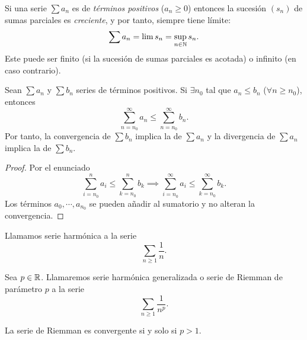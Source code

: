 \begin{prop}
    Si una serie $\sum a_n$ es de \textit{términos positivos} ($a_n \geq 0$) entonces la
    sucesión $(s_n)$ de sumas parciales es \textit{creciente}, y por tanto, siempre tiene
    límite:
    \[
        \sum a_n = \lim s_n = \sup_{n \in \mathbb{N}} s_n.
    \]
    Este puede ser finito (si la sucesión de sumas parciales es acotada) o infinito (en caso
    contrario).
\end{prop}

\begin{prop}
    Sean $\sum a_n$ y $\sum b_n$ series de términos positivos. Si $\exists n_0$ tal que
    $a_n \leq b_n$ ($\forall n \geq n_0$), entonces
    \[
        \sum_{n=n_0}^{\infty} a_n \leq \sum_{n=n_0}^{\infty} b_n.
    \]
    Por tanto, la convergencia de $\sum b_n$ implica la de $\sum a_n$ y la divergencia de
    $\sum a_n$ implica la de $\sum b_n$.
\end{prop}

\begin{proof}
    Por el enunciado
    \[
        \sum_{i=n_0}^{n} a_i \leq \sum_{k=n_0}^{n} b_k \implies
        \sum_{i=n_0}^{\infty} a_i \leq \sum_{k=n_0}^{\infty} b_k.
    \]
    Los términos $a_0, \cdots, a_{n_0}$ se pueden añadir al sumatorio y no alteran
    la convergencia.
\end{proof}

\begin{defi*}
    Llamamos serie harmónica a la serie
    \[
        \sum_{n \geq 1} \frac{1}{n}.
    \]
\end{defi*}

\begin{defi}
    Sea $p \in \mathbb{R}$. Llamaremos serie harmónica generalizada o serie de Riemman
    de parámetro $p$ a la serie
    \[
        \sum_{n \geq 1} \frac{1}{n^p}.
    \]
\end{defi}

\begin{prop*}
    La serie de Riemman es convergente si y solo si $p > 1$.
\end{prop*}


